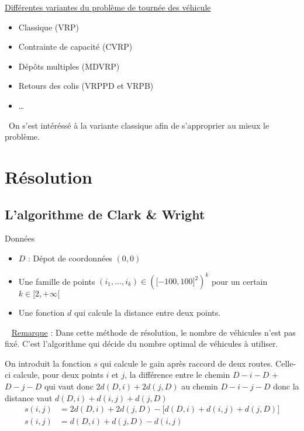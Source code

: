 \documentclass[10pt]{beamer}
\begin{document}
	\begin{frame}
		\underline{Différentes variantes du problème de tournée des véhicule}
		\begin{itemize}[label=—]
			\item Classique (VRP) \pause
			\item Contrainte de capacité (CVRP) \pause
			\item Dépôts multiples (MDVRP) \pause
			\item Retours des colis (VRPPD et VRPB) \pause
			\item \dots \pause
		\end{itemize}
		\ \newline On s'est intéréssé à la variante classique afin de s'approprier au mieux le problème.
	\end{frame}
	
	\section{Résolution}

	\subsection{L'algorithme de Clark \& Wright}

	\begin{frame}
		\begin{beamerboxesrounded}[upper=data_up,lower=data_low,shadow=true]{Données} \pause
			\begin{itemize}[label=-]
				\item $D$ : Dépot de coordonnées $(0,0)$\pause
				\item Une famille de points \((i_1,...,i_k) \in {(\lbrack-100,100\rbrack^2)}^k\) pour un certain $k \in \lbrack2,+\infty\lbrack$\pause
				\item Une fonction $d$ qui calcule la distance entre deux points. \pause
			\end{itemize}
		\end{beamerboxesrounded}\ \newline
		\underline{Remarque} : Dans cette méthode de résolution, le nombre de véhicules n'est pas fixé. C'est l'algorithme qui décide du nombre optimal de véhicules à utiliser. 
	\end{frame}
	 
	\begin{frame}	
		\begin{definition}
			On introduit la fonction $s$ qui calcule le gain après raccord de deux routes. Celle-ci calcule, pour deux points $i$ et $j$, la différence entre le chemin $D-i-D$ + $D-j-D$ qui vaut donc $2d(D,i) + 2d(j,D)$ au chemin $D-i-j-D$ donc la distance vaut $d(D,i) + d(i,j) + d(j,D)$
		\begin{align*}
			s(i,j) &= 2d(D,i) + 2d(j,D) - \lbrack d(D,i) + d(i,j) + d(j,D)\rbrack \\
			s(i,j) &= d(D,i) + d(j,D) - d(i,j)
		\end{align*}		
		\end{definition}
	\end{frame}
\end{document}
